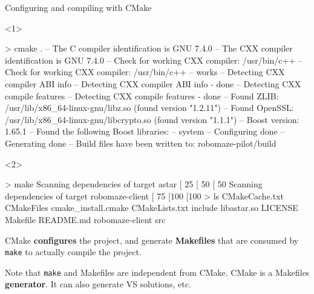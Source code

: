 \documentclass[compress]{beamer}
\begin{document}
\begin{frame}[fragile]{Configuring and compiling with CMake}

    \begin{onlyenv}<1>
\begin{shcode}
> cmake .
-- The C compiler identification is GNU 7.4.0
-- The CXX compiler identification is GNU 7.4.0
-- Check for working CXX compiler: /usr/bin/c++
-- Check for working CXX compiler: /usr/bin/c++ -- works
-- Detecting CXX compiler ABI info
-- Detecting CXX compiler ABI info - done
-- Detecting CXX compile features
-- Detecting CXX compile features - done
-- Found ZLIB: /usr/lib/x86_64-linux-gnu/libz.so (found version "1.2.11")
-- Found OpenSSL: /usr/lib/x86_64-linux-gnu/libcrypto.so (found version "1.1.1")
-- Boost version: 1.65.1
-- Found the following Boost libraries:
--   system
-- Configuring done
-- Generating done
-- Build files have been written to: robomaze-pilot/build
\end{shcode}
\end{onlyenv}
    \begin{onlyenv}<2>
\begin{shcode}

> make
Scanning dependencies of target astar
[ 25%
[ 50%
[ 50%
Scanning dependencies of target robomaze-client
[ 75%
[100%
[100%
> ls
CMakeCache.txt  CMakeFiles  cmake_install.cmake  CMakeLists.txt  include
    libastar.so  LICENSE  Makefile  README.md  robomaze-client  src
\end{shcode}

    CMake    {\bf configures} the project, and generate {\bf Makefiles} that are
    consumed by {\tt make} to actually compile the project.

\pause

    Note that {\tt make} and Makefiles are independent from CMake. CMake is a
    Makefiles {\bf generator}. It can also generate VS solutions, etc.

\end{onlyenv}
\end{frame}
\end{document}
